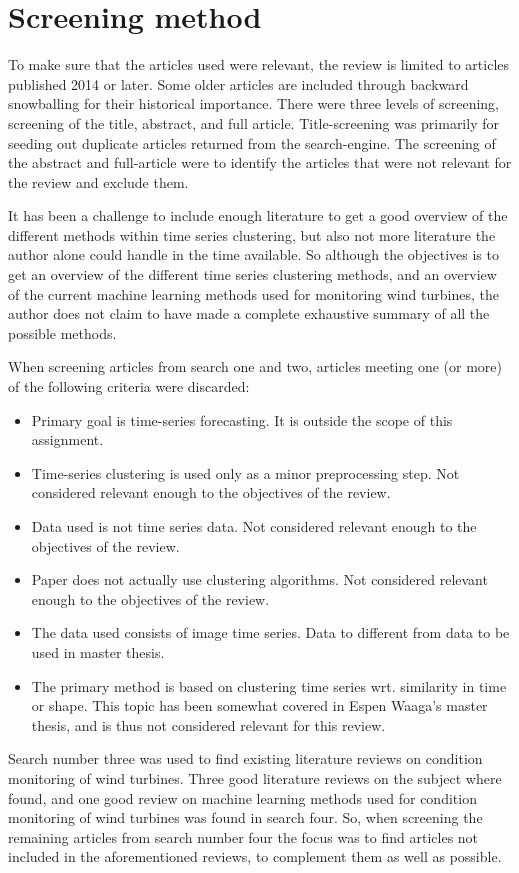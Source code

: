 \section{Screening method}
To make sure that the articles used were relevant, the review is limited to articles published 2014 or later. Some older articles are included through backward snowballing for their historical importance. There were three levels of screening, screening of the title, abstract, and full article. Title-screening was primarily for seeding out duplicate articles returned from the search-engine. The screening of the abstract and full-article were to identify the articles that were not relevant for the review and exclude them. \bigskip

It has been a challenge to include enough literature to get a good overview of the different methods within time series clustering, but also not more literature the author alone could handle in the time available. So although the objectives is to get an overview of the different time series clustering methods, and an overview of the current machine learning methods used for monitoring wind turbines, the author does not claim to have made a complete exhaustive summary of all the possible methods. \bigskip

When screening articles from search one and two, articles meeting one (or more) of the following criteria were discarded: 
\begin{itemize}
    \item Primary goal is time-series forecasting. It is outside the scope of this assignment.
    \item Time-series clustering is used only as a minor preprocessing step. Not considered relevant enough to the objectives of the review.
    \item Data used is not time series data. Not considered relevant enough to the objectives of the review.
    \item Paper does not actually use clustering algorithms. Not considered relevant enough to the objectives of the review.
    \item The data used consists of image time series. Data to different from data to be used in master thesis.
    \item The primary method is based on clustering time series wrt. similarity in time or shape. This topic has been somewhat covered in Espen Waaga's master thesis, and is thus not considered relevant for this review.
\end{itemize}

Search number three was used to find existing literature reviews on condition monitoring of wind turbines. Three good literature reviews on the subject where found, and one good review on machine learning methods used for condition monitoring of wind turbines was found in search four. So, when screening the remaining articles from search number four the focus was to find articles not included in the aforementioned reviews, to complement them as well as possible. \bigskip